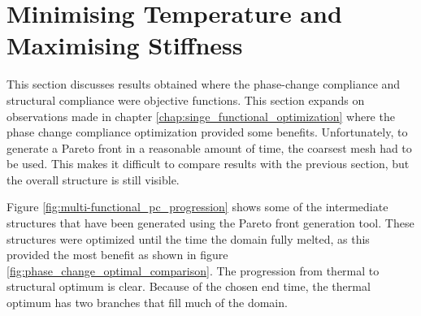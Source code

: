 \section{Minimising Temperature and Maximising Stiffness}
This section discusses results obtained where the phase-change compliance and structural compliance were objective functions. This section expands on observations made in chapter \ref{chap:singe_functional_optimization} where the phase change compliance optimization provided some benefits. Unfortunately, to generate a Pareto front in a reasonable amount of time, the coarsest mesh had to be used. This makes it difficult to compare results with the previous section, but the overall structure is still visible.

Figure \ref{fig:multi-functional_pc_progression} shows some of the intermediate structures that have been generated using the Pareto front generation tool. These structures were optimized until the time the domain fully melted, as this provided the most benefit as shown in figure \ref{fig:phase_change_optimal_comparison}. The progression from thermal to structural optimum is clear. Because of the chosen end time, the thermal optimum has two branches that fill much of the domain.
